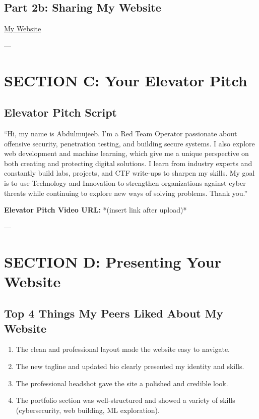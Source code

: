 \documentclass[12pt,a4paper]{article}
\begin{document}
\subsection*{Part 2b: Sharing My Website}
\href{https://sites.google.com/view/abdulmujeeb-uthman}{My Website}

---

\section*{SECTION C: Your Elevator Pitch}

\subsection*{Elevator Pitch Script}
``Hi, my name is Abdulmujeeb. I’m a Red Team Operator passionate about offensive security, penetration testing, and building secure systems. I also explore web development and machine learning, which give me a unique perspective on both creating and protecting digital solutions. I learn from industry experts and constantly build labs, projects, and CTF write-ups to sharpen my skills. My goal is to use Technology and Innovation to strengthen organizations against cyber threats while continuing to explore new ways of solving problems. Thank you.''  

\textbf{Elevator Pitch Video URL:} *(insert link after upload)*

---

\section*{SECTION D: Presenting Your Website}

\subsection*{Top 4 Things My Peers Liked About My Website}
\begin{enumerate}
    \item The clean and professional layout made the website easy to navigate.
    \item The new tagline and updated bio clearly presented my identity and skills.
    \item The professional headshot gave the site a polished and credible look.
    \item The portfolio section was well-structured and showed a variety of skills (cybersecurity, web building, ML exploration).
\end{enumerate}
\end{document}
